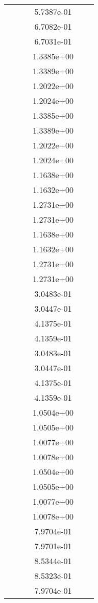 \begin{xltabular}{\textwidth}{r|rS[table-format=1.3e+2]S[table-format=1.4e+2]S[table-format=1.4e+2]S[table-format=-1.5]}
&  &  & 5.7387e-01 & & \\
&  &  & 6.7082e-01 & & \\
&  &  & 6.7031e-01 & & \\
&  &  & 1.3385e+00 & & \\
&  &  & 1.3389e+00 & & \\
&  &  & 1.2022e+00 & & \\
&  &  & 1.2024e+00 & & \\
&  &  & 1.3385e+00 & & \\
&  &  & 1.3389e+00 & & \\
&  &  & 1.2022e+00 & & \\
&  &  & 1.2024e+00 & & \\
&  &  & 1.1638e+00 & & \\
&  &  & 1.1632e+00 & & \\
&  &  & 1.2731e+00 & & \\
&  &  & 1.2731e+00 & & \\
&  &  & 1.1638e+00 & & \\
&  &  & 1.1632e+00 & & \\
&  &  & 1.2731e+00 & & \\
&  &  & 1.2731e+00 & & \\
&  &  & 3.0483e-01 & & \\
&  &  & 3.0447e-01 & & \\
&  &  & 4.1375e-01 & & \\
&  &  & 4.1359e-01 & & \\
&  &  & 3.0483e-01 & & \\
&  &  & 3.0447e-01 & & \\
&  &  & 4.1375e-01 & & \\
&  &  & 4.1359e-01 & & \\
&  &  & 1.0504e+00 & & \\
&  &  & 1.0505e+00 & & \\
&  &  & 1.0077e+00 & & \\
&  &  & 1.0078e+00 & & \\
&  &  & 1.0504e+00 & & \\
&  &  & 1.0505e+00 & & \\
&  &  & 1.0077e+00 & & \\
&  &  & 1.0078e+00 & & \\
&  &  & 7.9704e-01 & & \\
&  &  & 7.9701e-01 & & \\
&  &  & 8.5344e-01 & & \\
&  &  & 8.5323e-01 & & \\
&  &  & 7.9704e-01 & & \\

\end{xltabular}
